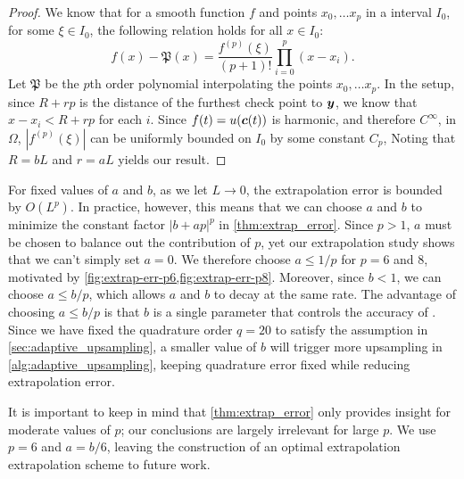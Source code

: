 \begin{proof}

    We know that for a smooth function $f$ and points $x_0, \hdots x_p$ in a \oned interval $I_0$, for some $\xi \in I_0$, the following relation holds for all $x \in I_0$:
\begin{equation}
    f(x) - \mathfrak{P}(x) = \frac{f^{(p)}(\xi)}{(p+1)!}\prod_{i=0}^p(x-x_i).
  \label{eq:exterp_err_init}
\end{equation}
Let $\mathfrak{P}$ be the $p$th order polynomial interpolating the points $x_0,\hdots x_p$.
In the \qbkix setup, since $R+rp$ is the distance of the furthest check point to ${\bm{y}}$, we know that $x - x_i < R +rp$ for each $i$.
Since $f(t) = u({\bm{c}}(t))$ is harmonic, and therefore $C^\infty$, in $\Omega$, $|f^{(p)}(\xi)|$ can be uniformly bounded on $I_0$ by some constant $C_p$,
Noting that $R = bL$ and $r=aL$ yields our result.
\end{proof}

For fixed values of $a$ and $b$, as we let $L\to 0$, the extrapolation error is bounded by $O(L^p)$.
In practice, however, this means that we can choose $a$ and $b$ to minimize the constant factor $|b+ap|^p$ in \cref{thm:extrap_error}.
Since $p>1$, $a$ must be chosen to balance out the contribution of $p$, yet our extrapolation study shows that we can't simply set $a=0$.  
We therefore choose $a \leq 1/p$ for $p=6$ and 8, motivated by \cref{fig:extrap-err-p6,fig:extrap-err-p8}.
Moreover, since $b < 1$, we can choose $a \leq b/p$, which allows $a$ and $b$ to decay at the same rate.
The advantage of choosing $a \leq b/p$ is that $b$ is a single parameter that controls the accuracy of \qbkix.
Since we have fixed the quadrature order $q=20$ to satisfy the assumption in \cref{sec:adaptive_upsampling}, a smaller value of $b$ will trigger more upsampling in \cref{alg:adaptive_upsampling}, keeping quadrature error fixed while reducing extrapolation error.

It is important to keep in mind that \cref{thm:extrap_error} only provides insight for moderate values of $p$; our conclusions are largely irrelevant for large $p$.
We use  $p = 6$ and $a = b/6$, leaving the construction of an optimal extrapolation extrapolation scheme to future work. 

